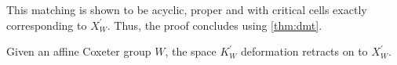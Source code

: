 \documentclass[class=article, crop=false]{standalone}
\begin{document}
This matching is shown to be acyclic, proper and with critical cells exactly corresponding to $X_W^\prime$. Thus, the proof concludes using \cref{thm:dmt}.

\begin{theorem}
    Given an affine Coxeter group $W$, the space $K^\prime_W$ deformation retracts on to $X^\prime_W$.
    \label{thm:K_prime_hom_equiv_X_prime}
\end{theorem}
\end{document}
